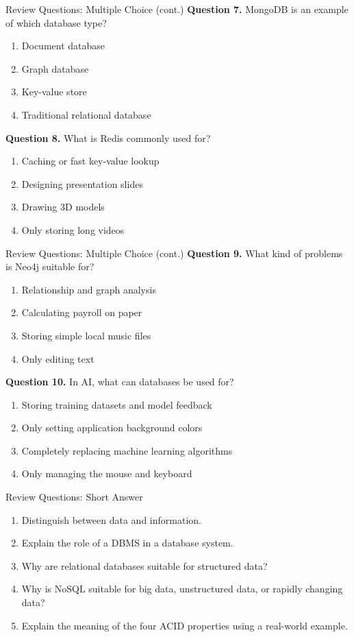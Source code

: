 \documentclass[aspectratio=169,11pt]{beamer}
\newcommand{\tightlist}{\setlength{\itemsep}{2pt}\setlength{\parskip}{0pt}}
\newcommand{\qoption}[2]{\item[#1.] #2}
\begin{document}
\begin{frame}{Review Questions: Multiple Choice (cont.)}
\small
\textbf{Question 7.} MongoDB is an example of which database type?
\begin{enumerate}
\tightlist
  \qoption{A}{Document database}
  \qoption{B}{Graph database}
  \qoption{C}{Key-value store}
  \qoption{D}{Traditional relational database}
\end{enumerate}

\textbf{Question 8.} What is Redis commonly used for?
\begin{enumerate}
\tightlist
  \qoption{A}{Caching or fast key-value lookup}
  \qoption{B}{Designing presentation slides}
  \qoption{C}{Drawing 3D models}
  \qoption{D}{Only storing long videos}
\end{enumerate}
\end{frame}

\begin{frame}{Review Questions: Multiple Choice (cont.)}
\small
\textbf{Question 9.} What kind of problems is Neo4j suitable for?
\begin{enumerate}
\tightlist
  \qoption{A}{Relationship and graph analysis}
  \qoption{B}{Calculating payroll on paper}
  \qoption{C}{Storing simple local music files}
  \qoption{D}{Only editing text}
\end{enumerate}

\textbf{Question 10.} In AI, what can databases be used for?
\begin{enumerate}
\tightlist
  \qoption{A}{Storing training datasets and model feedback}
  \qoption{B}{Only setting application background colors}
  \qoption{C}{Completely replacing machine learning algorithms}
  \qoption{D}{Only managing the mouse and keyboard}
\end{enumerate}
\end{frame}

\begin{frame}{Review Questions: Short Answer}
\small
\begin{enumerate}
\tightlist
  \item Distinguish between data and information.
  \item Explain the role of a DBMS in a database system.
  \item Why are relational databases suitable for structured data?
  \item Why is NoSQL suitable for big data, unstructured data, or rapidly changing data?
  \item Explain the meaning of the four ACID properties using a real-world example.
\end{enumerate}
\end{frame}
\end{document}
